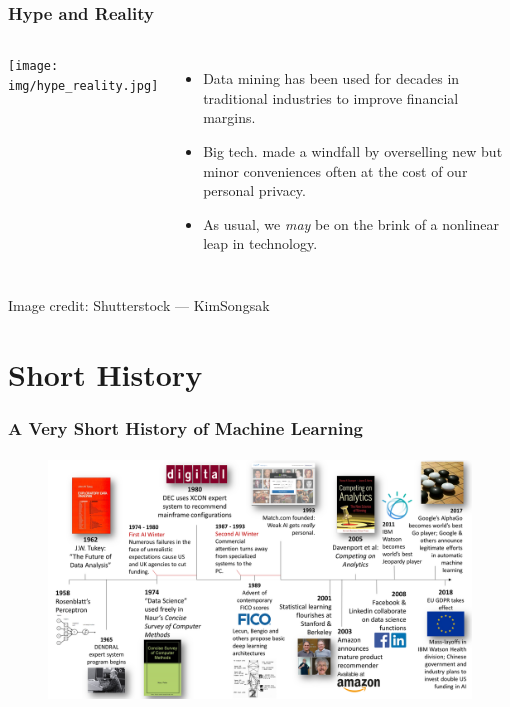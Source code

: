 \documentclass[11pt,
               aspectratio=169
               ]{beamer}
\begin{document}
	
		\begin{frame}
		
			\frametitle{Hype and Reality}
	
			\begin{columns}
	
				\centering
				\texttt{[image: img/hype\_reality.jpg]}
	
				\vspace{-5pt}
				\begin{itemize}
					
					\item Data mining has been used for decades in traditional industries to improve financial margins.
					\item Big tech. made a windfall by overselling new but minor conveniences often at the cost of our personal privacy. 
					\item As usual, we \textit{may} be on the brink of a nonlinear leap in technology.
					
				\end{itemize}
				
	
			\end{columns}

			\vspace{10pt}

			\tiny Image credit: Shutterstock --- KimSongsak
			

		\end{frame}
		
	
	\section{Short History}
	
		\begin{frame}
	
			\frametitle{A Very Short History of Machine Learning}
	
				\begin{figure}[htb]
					\begin{center}
						\includegraphics[height=185pt]{img/timeline.png}
						\label{fig:timeline}
					\end{center}
				\end{figure}
	
		\end{frame}	
	
\end{document}
